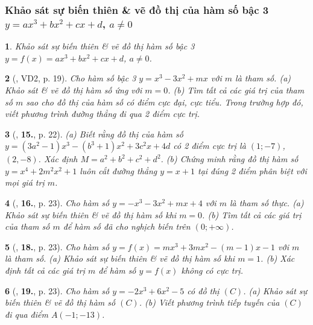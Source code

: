 \documentclass{article}
\newtheorem{baitoan}{}
\begin{document}
\subsubsection{Khảo sát sự biến thiên \& vẽ đồ thị của hàm số bậc 3 $y = ax^3 + bx^2 + cx + d$, $a\ne 0$}

\begin{baitoan}
	Khảo sát sự biến thiên \& vẽ đồ thị hàm số bậc 3 $y = f(x) = ax^3 + bx^2 + cx + d$, $a\ne 0$.
\end{baitoan}

\begin{baitoan}[\cite{TLCT_giai_tich_12}, VD2, p. 19]
	Cho hàm số bậc 3 $y = x^3 - 3x^2 + mx$ với $m$ là tham số. (a) Khảo sát \& vẽ đồ thị hàm số ứng với $m = 0$. (b) Tìm tất cả các giá trị của tham số $m$ sao cho đồ thị của hàm số có điểm cực đại, cực tiểu. Trong trường hợp đó, viết phương trình đường thẳng đi qua 2 điểm cực trị.
\end{baitoan}

\begin{baitoan}[\cite{TLCT_giai_tich_12}, \textbf{15.}, p. 22]
	(a) Biết rằng đồ thị của hàm số $y = (3a^2 - 1)x^3 - (b^3 + 1)x^2 + 3c^2x + 4d$ có 2 điểm cực trị là $(1;-7)$, $(2,-8)$. Xác định $M = a^2 + b^2 + c^2 + d^2$. (b) Chứng minh rằng đồ thị hàm số $y = x^4 + 2m^2x^2 + 1$ luôn cắt đường thẳng $y = x + 1$ tại đúng 2 điểm phân biệt với mọi giá trị $m$.
\end{baitoan}

\begin{baitoan}[\cite{TLCT_giai_tich_12}, \textbf{16.}, p. 23]
	Cho hàm số $y = -x^3 - 3x^2 + mx + 4$ với $m$ là tham số thực. (a) Khảo sát sự biến thiên \& vẽ đồ thị hàm số khi $m = 0$. (b) Tìm tất cả các giá trị của tham số $m$ để hàm số đã cho nghịch biến trên $(0;+\infty)$.
\end{baitoan}

\begin{baitoan}[\cite{TLCT_giai_tich_12}, \textbf{18.}, p. 23]
	Cho hàm số $y = f(x) = mx^3 + 3mx^2 - (m - 1)x - 1$ với $m$ là tham số. (a) Khảo sát sự biến thiên \& vẽ đồ thị hàm số khi $m = 1$. (b) Xác định tất cả các giá trị $m$ để hàm số $y = f(x)$ không có cực trị.	
\end{baitoan}

\begin{baitoan}[\cite{TLCT_giai_tich_12}, \textbf{19.}, p. 23]
	Cho hàm số $y = -2x^3 + 6x^2 - 5$ có đồ thị $(C)$. (a) Khảo sát sự biến thiên \& vẽ đồ thị hàm số $(C)$. (b) Viết phương trình tiếp tuyến của $(C)$ đi qua điểm $A(-1;-13)$.	
\end{baitoan}
\end{document}
